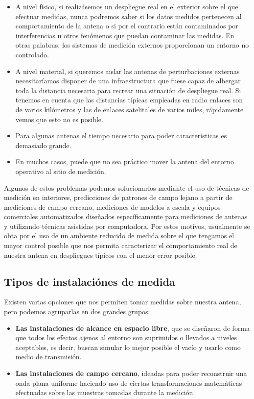 \begin{itemize}
    \item A nivel físico, si realizásemos un despliegue real en el exterior sobre el que efectuar medidas, nunca podremos saber si los datos medidos pertenecen al comportamiento de la antena o si por el contrario están contaminados por interferencias u otros fenómenos que puedan contaminar las medidas. En otras palabras, los sistemas de medición externos proporcionan un entorno no controlado.
    \item A nivel material, si queremos aislar las antenas de perturbaciones externas necesitaríamos disponer de una infraestructura que fuese capaz de albergar toda la distancia necesaria para recrear una situación de despliegue real. Si tenemos en cuenta que las distancias típicas empleadas en radio enlaces son de varios kilómetros y las de enlaces satelitales de varios miles, rápidamente vemos que esto no es posible.
    \item Para algunas antenas el tiempo necesario para poder características es demasiado grande.
    \item En muchos casos, puede que no sea práctico mover la antena del entorno operativo al sitio de medición. 
\end{itemize}

\noindent
Algunos de estos problemas podemos solucionarlos mediante el uso de técnicas de medición en interiores, predicciones de patrones de campo lejano a partir de mediciones de campo cercano, mediciones de modelos a escala y equipos comerciales automatizados diseñados específicamente para mediciones de antenas y utilizando técnicas asistidas por computadora. Por estos motivos, usualmente se obta por el uso de un ambiente reducido de medida sobre el que tengamos el mayor control posible que nos permita caracterizar el comportamiento real de nuestra antena en despliegues típicos con el menor error posible.

\newpage

\subsection{Tipos de instalaciónes de medida}

Existen varias opciones que nos permiten tomar medidas sobre nuestra antena, pero podemos agruparlas en dos grandes grupos:

\begin{itemize}
    \item \textbf{Las instalaciones de alcance en espacio libre}, que se diseñaron de forma que todos los efectos ajenos al entorno son suprimidos o llevados a niveles aceptables, es decir, buscan simular lo mejor posible el vacío y usarlo como medio de transmisión. 
    \item \textbf{Las instalaciones de campo cercano}, ideadas para poder reconstruir una onda plana uniforme haciendo uso de ciertas transformaciones matemáticas efectuadas sobre las muestras tomadas durante la medición. 
\end{itemize}


